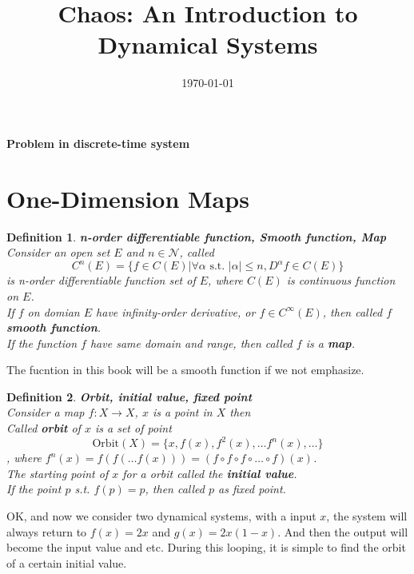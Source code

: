 \documentclass[12pt]{article}
\title{Chaos: An Introduction to Dynamical Systems}
\author{}
\date{\today}
\theoremstyle{plain}
\newtheorem{definition}{{\color{red}\textbf{Definition}}}[section]
\begin{document}
\tableofcontents
\newpage
\setcounter{page}{1}

\maketitle


{
\begin{center}
\LARGE \textbf{Problem in discrete-time system}
\end{center}
}
\section{One-Dimension Maps}

\begin{definition}\textbf{n-order differentiable function, Smooth function, Map}
\\\noindent Consider an open set $E$ and $n \in \mathcal N$, called 
$$
C^n(E) = \{f \in C(E) | \forall \alpha \text{ s.t. } |\alpha| \leq n, D^\alpha f \in C(E)\}
$$
is n-order differentiable function set of $E$, where $C(E)$ is continuous function on $E$.
\\\noindent If $f$ on domian $E$ have infinity-order derivative, or $f \in C^\infty(E)$, then called $f$ \textbf{smooth function}.
\\\noindent If the function $f$ have same domain and range, then called $f$ is a \textbf{map}.
\end{definition}

{\color{red} The fucntion in this book will be a smooth function if we not emphasize.}

\begin{definition}\textbf{Orbit, initial value, fixed point}
\\\noindent Consider a map $f: X \rightarrow X$, $x$ is a point in $X$ then 
\\\noindent Called \textbf{orbit} of $x$ is a set of point 
$$
\text{Orbit}(X) = \{x, f(x), f^2(x), \ldots f^n(x), \ldots\}
$$
, where $f^n(x) = f(f(\ldots f(x))) = (f\circ f \circ f \circ \ldots \circ f)(x)$.
\\\noindent The starting point of $x$ for a orbit called the \textbf{initial value}.
\\\noindent If the point $p$ s.t. $f(p) = p$, then called $p$ as fixed point.
\end{definition}

OK, and now we consider two dynamical systems, with a input $x$, the system will always return to $f(x) = 2x$ and $g(x) = 2x(1-x)$. And then the output will become the input value and etc. During this looping, it is simple to find the orbit of a certain initial value.
\end{document}
